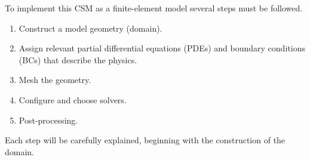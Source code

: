 To implement this CSM as a finite-element model several steps must be followed.
\begin{enumerate}
  \item Construct a model geometry (domain).
  \item Assign relevant partial differential equations (PDEs) and boundary conditions (BCs) that describe the physics.
  \item Mesh the geometry.
  \item Configure and choose solvers.
  \item Post-processing.
\end{enumerate}
Each step will be carefully explained, beginning with the construction of the domain.
